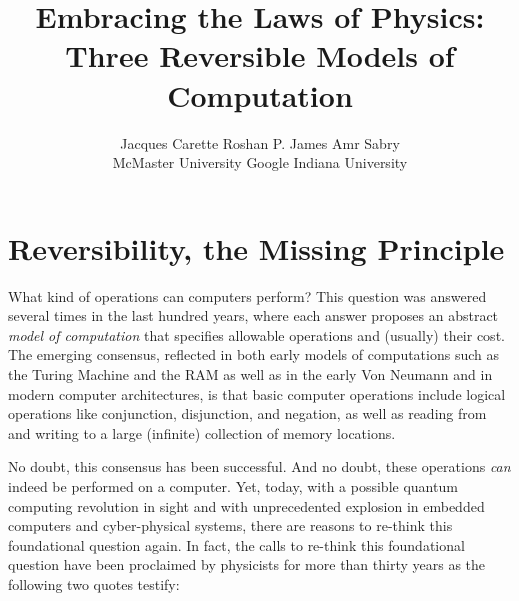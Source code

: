 \documentclass{article}
\title{Embracing the Laws of Physics: \\ Three Reversible Models of Computation}
\author{Jacques Carette \qquad\qquad Roshan P. James \qquad\qquad Amr Sabry \\
McMaster University \qquad\qquad Google \qquad\qquad Indiana University}
\begin{document}
\maketitle









\section{Reversibility, the Missing Principle}

What kind of operations can computers perform? This question was
answered several times in the last hundred years, where each answer
proposes an abstract \emph{model of computation} that specifies
allowable operations and (usually) their cost. The emerging consensus,
reflected in both early models of computations such as the Turing
Machine and the RAM as well as in the early Von Neumann and in modern
computer architectures, is that basic computer operations include
logical operations like conjunction, disjunction, and negation, as
well as reading from and writing to a large (infinite) collection of
memory locations.

No doubt, this consensus has been successful. And no doubt, these
operations \emph{can} indeed be performed on a computer. Yet, today,
with a possible quantum computing revolution in sight and with
unprecedented explosion in embedded computers and cyber-physical
systems, there are reasons to re-think this foundational question
again. In fact, the calls to re-think this foundational question have
been proclaimed by physicists for more than thirty years as the
following two quotes testify:
\end{document}
